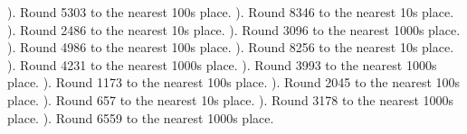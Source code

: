 \documentclass{article}%
\begin{document}
\newline%
). Round 5303 to the nearest 100s place.%
\newline%
\newline%
). Round 8346 to the nearest 10s place.%
\newline%
\newline%
). Round 2486 to the nearest 10s place.%
\newline%
\newline%
). Round 3096 to the nearest 1000s place.%
\newline%
\newline%
). Round 4986 to the nearest 100s place.%
\newline%
\newline%
). Round 8256 to the nearest 10s place.%
\newline%
\newline%
). Round 4231 to the nearest 1000s place.%
\newline%
\newline%
). Round 3993 to the nearest 1000s place.%
\newline%
\newline%
). Round 1173 to the nearest 100s place.%
\newline%
\newline%
). Round 2045 to the nearest 100s place.%
\newline%
\newline%
). Round 657 to the nearest 10s place.%
\newline%
\newline%
). Round 3178 to the nearest 1000s place.%
\newline%
\newline%
). Round 6559 to the nearest 1000s place.%
\newline%
\newline%
\newline%
\end{document}
